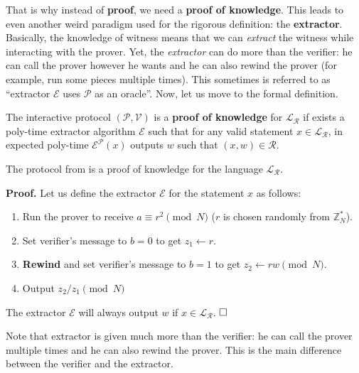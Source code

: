 \documentclass[../lecture-notes-148x210.tex]{subfiles}
\begin{document}
That is why instead of \textbf{proof}, we need a \textbf{proof of knowledge}. This leads to even another weird paradigm used for the rigorous definition: the \textbf{extractor}. Basically, the knowledge of witness means that we can \textit{extract} the witness while interacting with the prover. Yet, the \textit{extractor} can do more than the verifier: he can call the prover however he wants and he can also rewind the prover (for example, run some pieces multiple times). This sometimes is referred to as ``extractor $\mathcal{E}$ uses $\mathcal{P}$ as an oracle''. 
Now, let us move to the formal definition.

\begin{definition}
    The interactive protocol $(\mathcal{P}, \mathcal{V})$ is a \textbf{proof of knowledge} for $\mathcal{L}_{\mathcal{R}}$ if exists a poly-time extractor algorithm $\mathcal{E}$ such that for any valid statement $x \in \mathcal{L}_{\mathcal{R}}$, in expected poly-time $\mathcal{E}^{\mathcal{P}}(x)$ outputs $w$ such that $(x,w) \in \mathcal{R}$.
\end{definition}

\begin{lemma}
    The protocol from  is a proof of knowledge for the language $\mathcal{L}_{\mathcal{R}}$. 
\end{lemma}

\textbf{Proof.} Let us define the extractor $\mathcal{E}$ for the statement $x$ as follows:
\begin{enumerate}
    \item Run the prover to receive $a \equiv r^2 \pmod{N}$ ($r$ is chosen randomly from $\mathbb{Z}_N^*$).
    \item Set verifier's message to $b=0$ to get $z_1 \gets r$.
    \item \textbf{Rewind} and set verifier's message to $b=1$ to get $z_2 \gets rw \pmod{N}$.
    \item Output $z_2/z_1 \pmod{N}$
\end{enumerate}

The extractor $\mathcal{E}$ will always output $w$ if $x \in \mathcal{L}_{\mathcal{R}}$. $\hfill\Box$

\begin{remark}
    Note that extractor is given much more than the verifier: he can call the prover multiple times and he can also rewind the prover. This is the main difference between the verifier and the extractor.    
\end{remark}
\end{document}
